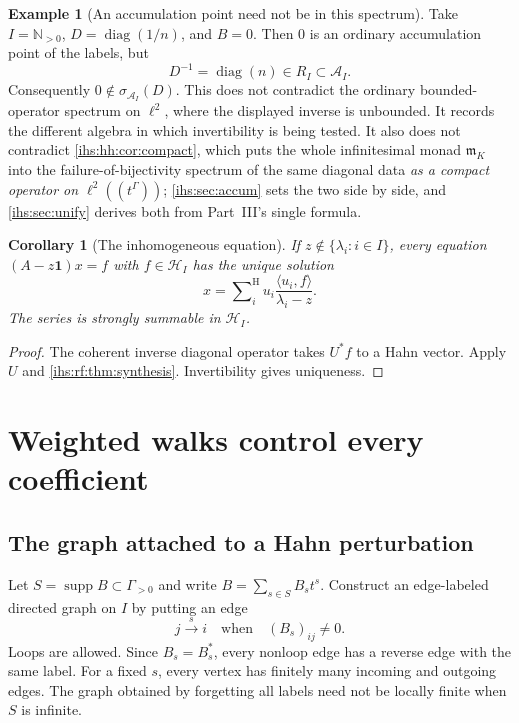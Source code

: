 \documentclass[11pt,a4paper]{article}
\numberwithin{equation}{section}
\newtheorem{corollary}[corollary]{Corollary}
\theoremstyle{definition}
\newtheorem{example}[example]{Example}
\theoremstyle{remark}
\newcommand{\N}{\mathbb N}
\newcommand{\mK}{\mathfrak m_K}
\newcommand{\Hrf}{\mathcal H_I}
\newcommand{\Arf}{\mathcal A_I}
\newcommand{\supp}{\operatorname{supp}}
\newcommand{\diag}{\operatorname{diag}}
\newcommand{\Id}{\mathbf 1}
\newcommand{\sH}{\mathop{\sum}\nolimits^{\mathrm H}}
\newcommand{\ip}[2]{\langle#1,#2\rangle}
\begin{document}
\begin{example}[An accumulation point need not be in this spectrum]\label{ihs:rf:ex:accum}
Take $I=\N_{>0}$, $D=\diag(1/n)$, and $B=0$. Then $0$ is an ordinary
accumulation point of the labels, but
\[
 D^{-1}=\diag(n)\in R_I\subset\Arf.
\]
Consequently $0\notin\sigma_{\Arf}(D)$. This does not contradict the
ordinary bounded-operator spectrum on $\ell^2$, where the displayed inverse
is unbounded. It records the different algebra in which invertibility is
being tested. It also does not contradict \cref{ihs:hh:cor:compact}, which
puts the whole infinitesimal monad $\mK$ into the failure-of-bijectivity
spectrum of the same diagonal data \emph{as a compact operator on
$\ell^2((t^\Gamma))$}; \cref{ihs:sec:accum} sets the two side by side, and
\cref{ihs:sec:unify} derives both from Part~III's single formula.
\end{example}

\begin{corollary}[The inhomogeneous equation]\label{ihs:rf:cor:forcing}
If $z\notin\{\lambda_i:i\in I\}$, every equation $(A-z\Id)x=f$ with
$f\in\Hrf$ has the unique solution
\[
 x=\sH_i u_i\frac{\ip{u_i}{f}}{\lambda_i-z}.
\]
The series is strongly summable in $\Hrf$.
\end{corollary}
\begin{proof}
The coherent inverse diagonal operator takes $U^*f$ to a Hahn vector. Apply
$U$ and \cref{ihs:rf:thm:synthesis}. Invertibility gives uniqueness.
\end{proof}

\section{Weighted walks control every coefficient}\label{ihs:sec:locality}

\subsection{The graph attached to a Hahn perturbation}\label{ihs:rf:sec:graph}
Let $S=\supp B\subset\Gamma_{>0}$ and write $B=\sum_{s\in S}B_s t^s$.
Construct an edge-labeled directed graph on $I$ by putting an edge
\[
 j\xrightarrow{\ s\ }i \quad\text{when}\quad (B_s)_{ij}\ne0.
\]
Loops are allowed. Since $B_s=B_s^*$, every nonloop edge has a reverse edge
with the same label. For a fixed $s$, every vertex has finitely many
incoming and outgoing edges. The graph obtained by forgetting all labels
need not be locally finite when $S$ is infinite.
\end{document}
